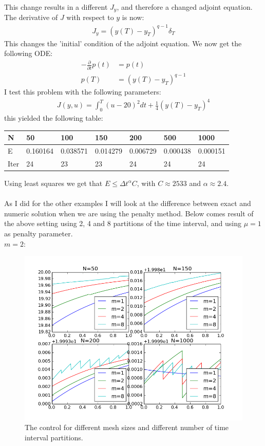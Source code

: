 \documentclass[11pt,a4paper]{report}
\begin{document}
This change results in a different $J_y$, and therefore a changed adjoint equation. The derivative of $J$ with respect to $y$ is now:
\begin{align*}
J_y = (y(T)-y_T)^{q-1}\delta_T
\end{align*}
This changes the 'initial' condition of the adjoint equation. We now get the following ODE:
\begin{align*}
-\frac{\partial }{\partial t}p(t) &=p(t)  \\
p(T) &= (y(T)-y_T)^{q-1}
\end{align*}
I test this problem with the following parameters:
\begin{align*}
J(y,u) = \int_0^T (u-20)^2 dt + \frac{1}{4}(y(T)-y_T)^4
\end{align*}
this yielded the following table: 
\begin{center}
    \begin{tabular}{| l | l | l | l | l | l | l |}
    \hline
    N & 50 & 100  & 150 & 200 & 500 & 1000 \\ \hline
    E & 0.160164 & 0.038571 &0.014279 & 0.006729 & 0.000438 & 0.000151	\\ \hline
    Iter & 24 & 23  & 23 & 24 & 24 & 24 \\ \hline
    \end{tabular}
\end{center}
Using least squares we get that $E\leq \Delta t^{\alpha}C$, with $C\approx 2533$ and $\alpha\approx2.4$.
\\
\\
As I did for the other examples I will look at the difference between exact and numeric solution when we are using the penalty method. Below comes result of the above setting using 2, 4 and 8 partitions of the time interval, and using $\mu=1$ as penalty parameter.
\\
$m=2$:
\begin{figure}
  \includegraphics[width=\linewidth]{resC_manu_control.png}
  \caption{The control for different mesh sizes and different number of time interval partitions. }
  \label{Fig 5}
\end{figure}
\end{document}
